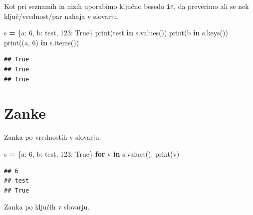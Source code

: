 \documentclass[
]{report}
\newenvironment{Shaded}{\begin{snugshade}}{\end{snugshade}}
\newcommand{\BuiltInTok}[1]{#1}
\newcommand{\ControlFlowTok}[1]{\textcolor[rgb]{0.13,0.29,0.53}{\textbf{#1}}}
\newcommand{\DecValTok}[1]{\textcolor[rgb]{0.00,0.00,0.81}{#1}}
\newcommand{\KeywordTok}[1]{\textcolor[rgb]{0.13,0.29,0.53}{\textbf{#1}}}
\newcommand{\NormalTok}[1]{#1}
\newcommand{\OperatorTok}[1]{\textcolor[rgb]{0.81,0.36,0.00}{\textbf{#1}}}
\newcommand{\StringTok}[1]{\textcolor[rgb]{0.31,0.60,0.02}{#1}}
\newcommand{\VariableTok}[1]{\textcolor[rgb]{0.00,0.00,0.00}{#1}}
\begin{document}
Kot pri seznamih in nizih uporabimo ključno besedo \texttt{in}, da preverimo ali se nek ključ/vrednost/par nahaja v slovarju.

\begin{Shaded}
\begin{Highlighting}[]
\NormalTok{s }\OperatorTok{=}\NormalTok{ \{}\StringTok{\textquotesingle{}a\textquotesingle{}}\NormalTok{: }\DecValTok{6}\NormalTok{, }\StringTok{\textquotesingle{}b\textquotesingle{}}\NormalTok{: }\StringTok{\textquotesingle{}test\textquotesingle{}}\NormalTok{, }\DecValTok{123}\NormalTok{: }\VariableTok{True}\NormalTok{\}}
\BuiltInTok{print}\NormalTok{(}\StringTok{\textquotesingle{}test\textquotesingle{}} \KeywordTok{in}\NormalTok{ s.values())}
\BuiltInTok{print}\NormalTok{(}\StringTok{\textquotesingle{}b\textquotesingle{}} \KeywordTok{in}\NormalTok{ s.keys())}
\BuiltInTok{print}\NormalTok{((}\StringTok{\textquotesingle{}a\textquotesingle{}}\NormalTok{, }\DecValTok{6}\NormalTok{) }\KeywordTok{in}\NormalTok{ s.items())}
\end{Highlighting}
\end{Shaded}

\begin{verbatim}
## True
## True
## True
\end{verbatim}

\hypertarget{zanke-2}{%
\section{Zanke}\label{zanke-2}}

Zanka po vrednostih v slovarju.

\begin{Shaded}
\begin{Highlighting}[]
\NormalTok{s }\OperatorTok{=}\NormalTok{ \{}\StringTok{\textquotesingle{}a\textquotesingle{}}\NormalTok{: }\DecValTok{6}\NormalTok{, }\StringTok{\textquotesingle{}b\textquotesingle{}}\NormalTok{: }\StringTok{\textquotesingle{}test\textquotesingle{}}\NormalTok{, }\DecValTok{123}\NormalTok{: }\VariableTok{True}\NormalTok{\}}
\ControlFlowTok{for}\NormalTok{ v }\KeywordTok{in}\NormalTok{ s.values():}
    \BuiltInTok{print}\NormalTok{(v)}
\end{Highlighting}
\end{Shaded}

\begin{verbatim}
## 6
## test
## True
\end{verbatim}

Zanka po ključih v slovarju.
\end{document}
